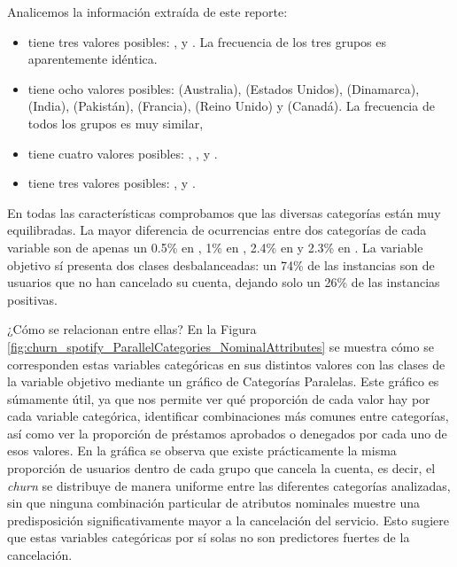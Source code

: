 Analicemos la información extraída de este reporte:

\begin{itemize}
    \item {} tiene tres valores posibles: ,  y . La frecuencia de los tres grupos es aparentemente idéntica. 
    
    \item {} tiene ocho valores posibles:  (Australia),  (Estados Unidos),  (Dinamarca),  (India),  (Pakistán),  (Francia),  (Reino Unido) y  (Canadá). La frecuencia de todos los grupos es muy similar, 
    
    \item {} tiene cuatro valores posibles: , ,  y . 
    
    \item {} tiene tres valores posibles: ,  y . 

\end{itemize}

En todas las características comprobamos que las diversas categorías están muy equilibradas. La mayor diferencia de ocurrencias entre dos categorías de cada variable son de apenas un 0.5\% en , 1\% en , 2.4\% en  y 2.3\% en . La variable objetivo sí presenta dos clases desbalanceadas: un 74\% de las instancias son de usuarios que no han cancelado su cuenta, dejando solo un 26\% de las instancias positivas. 

¿Cómo se relacionan entre ellas? En la Figura \ref{fig:churn_spotify_ParallelCategories_NominalAttributes} se muestra cómo se corresponden estas variables categóricas en sus distintos valores con las clases de la variable objetivo mediante un gráfico de Categorías Paralelas. Este gráfico es súmamente útil, ya que nos permite ver qué proporción de cada valor hay por cada variable categórica, identificar combinaciones más comunes entre categorías, así como ver la proporción de préstamos aprobados o denegados por cada uno de esos valores. En la gráfica se observa que existe prácticamente la misma proporción de usuarios dentro de cada grupo que cancela la cuenta, es decir, el \textit{churn} se distribuye de manera uniforme entre las diferentes categorías analizadas, sin que ninguna combinación particular de atributos nominales muestre una predisposición significativamente mayor a la cancelación del servicio. Esto sugiere que estas variables categóricas por sí solas no son predictores fuertes de la cancelación.

